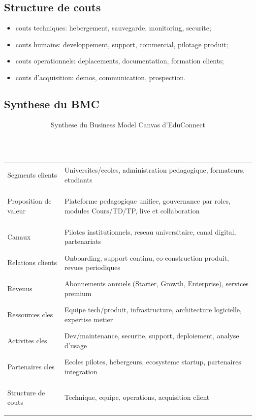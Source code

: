 ﻿\documentclass[12pt,a4paper,oneside]{report}
\begin{document}
\subsection{Structure de couts}

\begin{itemize}
  \item couts techniques: hebergement, sauvegarde, monitoring, securite;
  \item couts humains: developpement, support, commercial, pilotage produit;
  \item couts operationnels: deplacements, documentation, formation clients;
  \item couts d'acquisition: demos, communication, prospection.
\end{itemize}

\subsection{Synthese du BMC}

\renewcommand{\arraystretch}{1.45}
\begin{longtable}{|>{\bfseries\raggedright\arraybackslash}p{3.2cm}|p{10.2cm}|}
\caption{Synthese du Business Model Canvas d'EduConnect}
\label{tab:bmc_edconnect} \\
\hline
\rowcolor{ustoblue}
\textcolor{white}{Bloc} & \textcolor{white}{Elements principaux} \\
\hline
Segments clients & Universites/ecoles, administration pedagogique, formateurs, etudiants \\
\hline
Proposition de valeur & Plateforme pedagogique unifiee, gouvernance par roles, modules Cours/TD/TP, live et collaboration \\
\hline
Canaux & Pilotes institutionnels, reseau universitaire, canal digital, partenariats \\
\hline
Relations clients & Onboarding, support continu, co-construction produit, revues periodiques \\
\hline
Revenus & Abonnements annuels (Starter, Growth, Enterprise), services premium \\
\hline
Ressources cles & Equipe tech/produit, infrastructure, architecture logicielle, expertise metier \\
\hline
Activites cles & Dev/maintenance, securite, support, deploiement, analyse d'usage \\
\hline
Partenaires cles & Ecoles pilotes, hebergeurs, ecosysteme startup, partenaires integration \\
\hline
Structure de couts & Technique, equipe, operations, acquisition client \\
\hline
\end{longtable}
\end{document}
